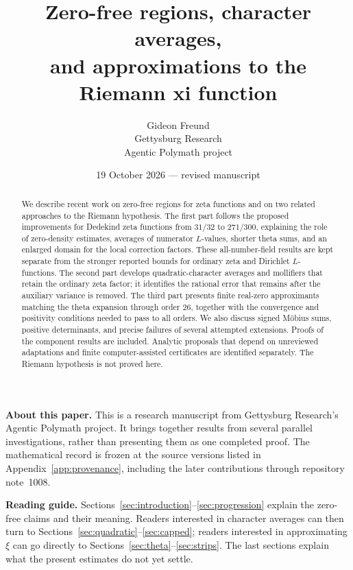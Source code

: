 \documentclass[11pt,a4paper]{article}
\title{Zero-free regions, character averages,\\
and approximations to the Riemann xi function}
\author{Gideon Freund\\[4pt]
\normalsize Gettysburg Research\\
\normalsize Agentic Polymath project}
\date{19 October 2026 --- revised manuscript}
\numberwithin{equation}{section}
\theoremstyle{definition}
\theoremstyle{remark}
\begin{document}
\maketitle
\begin{abstract}
We describe recent work on zero-free regions for zeta functions and on two related approaches to the Riemann hypothesis. The first part follows the proposed improvements for Dedekind zeta functions from $31/32$ to $271/300$, explaining the role of zero-density estimates, averages of numerator $L$-values, shorter theta sums, and an enlarged domain for the local correction factors. These all-number-field results are kept separate from the stronger reported bounds for ordinary zeta and Dirichlet $L$-functions. The second part develops quadratic-character averages and mollifiers that retain the ordinary zeta factor; it identifies the rational error that remains after the auxiliary variance is removed. The third part presents finite real-zero approximants matching the theta expansion through order $26$, together with the convergence and positivity conditions needed to pass to all orders. We also discuss signed M\"obius sums, positive determinants, and precise failures of several attempted extensions. Proofs of the component results are included. Analytic proposals that depend on unreviewed adaptations and finite computer-assisted certificates are identified separately. The Riemann hypothesis is not proved here.
\end{abstract}
\medskip
\noindent\textbf{About this paper.} This is a research manuscript from Gettysburg Research's Agentic Polymath project. It brings together results from several parallel investigations, rather than presenting them as one completed proof. The mathematical record is frozen at the source versions listed in Appendix~\ref{app:provenance}, including the later contributions through repository note~1008.
\par\medskip
\noindent\textbf{Reading guide.} Sections~\ref{sec:introduction}--\ref{sec:progression} explain the zero-free claims and their meaning. Readers interested in character averages can then turn to Sections~\ref{sec:quadratic}--\ref{sec:capped}; readers interested in approximating $\xi$ can go directly to Sections~\ref{sec:theta}--\ref{sec:strips}. The last sections explain what the present estimates do not yet settle.
\clearpage
\tableofcontents
\clearpage






\end{document}
